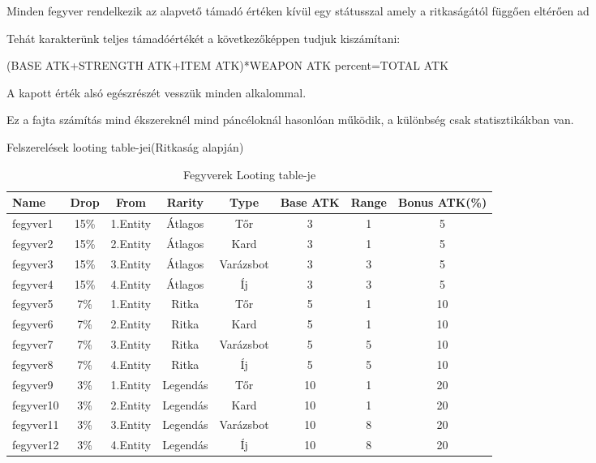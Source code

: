 Minden fegyver rendelkezik az alapvető támadó értéken kívül egy státusszal amely a ritkaságától függően eltérően ad %

Tehát karakterünk teljes támadóértékét a következőképpen tudjuk kiszámítani:

(BASE ATK+STRENGTH ATK+ITEM ATK)*WEAPON ATK percent=TOTAL ATK

A kapott érték alsó egészrészét vesszük minden alkalommal.

Ez a fajta számítás mind ékszereknél mind páncéloknál hasonlóan működik, a különbség csak statisztikákban van.

Felszerelések looting table-jei(Ritkaság alapján)
\begin{table}[H]
\centering
\caption{Fegyverek Looting table-je}
\label{tab:minta}
\tabcolsep=0.11cm
\begin{tabular}{|l|c|c|c|c|c|c|c|}
\hline
 Name & Drop & From & Rarity & Type & Base ATK & Range & Bonus ATK(\%) \\
\hline
 fegyver1 & 15\% & 1.Entity & Átlagos & Tőr & 3 & 1 & 5 \\
\hline
 fegyver2 & 15\% & 2.Entity & Átlagos & Kard & 3 & 1 & 5 \\
\hline
 fegyver3 & 15\% & 3.Entity & Átlagos & Varázsbot & 3 & 3 & 5\\
\hline
 fegyver4 & 15\% & 4.Entity & Átlagos  & Íj & 3 & 3 & 5\\
\hline
 fegyver5 & 7\% & 1.Entity & Ritka & Tőr & 5 & 1 & 10 \\
\hline
 fegyver6 & 7\% & 2.Entity & Ritka & Kard & 5 & 1 & 10 \\
\hline
 fegyver7 & 7\% & 3.Entity & Ritka & Varázsbot & 5 & 5 & 10\\
\hline
 fegyver8 & 7\% & 4.Entity & Ritka  & Íj & 5 & 5 & 10\\
\hline
 fegyver9 & 3\% & 1.Entity & Legendás & Tőr & 10 & 1 & 20 \\
\hline
 fegyver10 & 3\% & 2.Entity & Legendás & Kard & 10 & 1 & 20 \\
\hline
 fegyver11 & 3\% & 3.Entity & Legendás & Varázsbot & 10 & 8 & 20\\
\hline
 fegyver12 & 3\% & 4.Entity & Legendás  & Íj & 10 & 8 & 20\\
\hline
\end{tabular}
\end{table}
\tabcolsep=0.11cm
